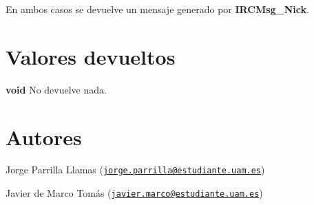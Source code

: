En ambos casos se devuelve un mensaje generado por {\bfseries I\+R\+C\+Msg\+\_\+\+Nick}. \hypertarget{server_command_nick_return_nick}{}\section{Valores devueltos}\label{server_command_nick_return_nick}

\begin{DoxyItemize}
\item {\bfseries void} No devuelve nada. 
\end{DoxyItemize}\hypertarget{server_command_nick_authors_nick}{}\section{Autores}\label{server_command_nick_authors_nick}

\begin{DoxyItemize}
\item Jorge Parrilla Llamas (\href{mailto:jorge.parrilla@estudiante.uam.es}{\tt jorge.\+parrilla@estudiante.\+uam.\+es}) 
\item Javier de Marco Tomás (\href{mailto:javier.marco@estudiante.uam.es}{\tt javier.\+marco@estudiante.\+uam.\+es}) 
\end{DoxyItemize}
